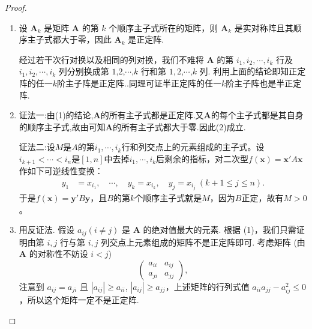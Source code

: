 \documentclass[../../main.tex]{subfiles}
\begin{document}
\begin{proof}
\begin{enumerate}[(1)]
\item 设 $\boldsymbol{A}_k$ 是矩阵 $\boldsymbol{A}$ 的第 $k$ 个顺序主子式所在的矩阵，则 $\boldsymbol{A}_k$ 是实对称阵且其顺序主子式都大于零，因此 $\boldsymbol{A}_k$ 是正定阵.

经过若干次行对换以及相同的列对换，我们不难将 $\boldsymbol{A}$ 的第 $i_1,i_2,\cdots,i_k$ 行及 $i_1,i_2,\cdots,i_k$ 列分别换成第 $1$,$2$,$\cdots$,$k$ 行和第 $1,2$,$\cdots$,$k$ 列. 利用上面的结论即知正定阵的任一$k$阶主子阵是正定阵..同理可证半正定阵的任一$k$阶主子阵也是半正定阵.

\item {\color{blue}证法一:}由(1)的结论,$\boldsymbol{A}$的所有主子式都是正定阵.又$\boldsymbol{A}$的每个主子式都是其自身的顺序主子式,故由可知$\boldsymbol{A}$的所有主子式都大于零.因此(2)成立.

{\color{blue}证法二:}设\(M\)是\(A\)的第\(i_1,\cdots,i_k\)行和列交点上的元素组成的主子式。设\(i_{k + 1}<\cdots < i_n\)是\([1,n]\)中去掉\(i_1,\cdots,i_k\)后剩余的指标，对二次型\(f(\boldsymbol{x})=\boldsymbol{x}'A\boldsymbol{x}\)作如下可逆线性变换：
\begin{align*}
y_1&=x_{i_1},\quad\cdots,\quad y_k = x_{i_k},\quad y_j = x_{i_j}\ (k + 1\leqslant  j\leqslant  n).
\end{align*}
于是\(f(\boldsymbol{x})=\boldsymbol{y}'B\boldsymbol{y}\)，且\(B\)的第\(k\)个顺序主子式就是\(M\)，因为\(B\)正定，故有\(M > 0\)。

\item 用反证法. 假设 $a_{ij}(i\neq j)$ 是 $\boldsymbol{A}$ 的绝对值最大的元素. 根据 (1)，我们只需证明由第 $i,j$ 行与第 $i,j$ 列交点上元素组成的矩阵不是正定阵即可. 考虑矩阵 (由 $\boldsymbol{A}$ 的对称性不妨设 $i < j$)
\[
\begin{pmatrix}
a_{ii} & a_{ij}\\
a_{ji} & a_{jj}
\end{pmatrix},
\]
注意到 $a_{ij} = a_{ji}$ 且 $|a_{ij}|\geqslant  a_{ii}$, $|a_{ij}|\geqslant  a_{jj}$，上述矩阵的行列式值 $a_{ii}a_{jj}-a_{ij}^2\leqslant  0$，所以这个矩阵一定不是正定阵. 
\end{enumerate}

\end{proof}
\end{document}
